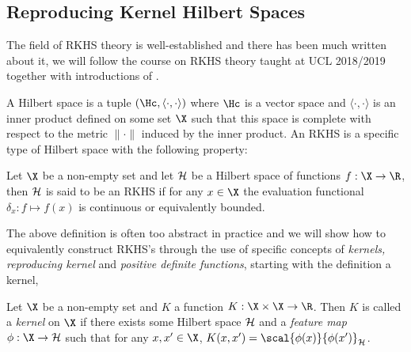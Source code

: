 \subsection{Reproducing Kernel Hilbert Spaces} The field of RKHS theory is
well-established and there has been much written about it, we will follow the
course on RKHS theory taught at UCL 2018/2019
\citep{gretton18_advan_topic_machin_learn} together with introductions of
\citep{manton15_primer_reprod_kernel_hilber_spaces,fasshauer11_posit_defin_kernel}.

A Hilbert space is a tuple \((\Hc, \langle \cdot, \cdot \rangle)\) where \(\Hc\)
is a vector space and \(\langle \cdot, \cdot \rangle\) is an inner product
defined on some set \(\X\) such that this space is complete with respect to the
metric \(\|\cdot\|\) induced by the inner product. An RKHS is a specific type of
Hilbert space with the following property:

\begin{definition}
\label{def:RKHS} Let \(\X\) be a non-empty set and let \(\mathcal{H}\) be a Hilbert
space of functions \(f: \X \to \R\), then \(\mathcal{H}\) is said to be an RKHS if
for any \(x \in \X\) the evaluation functional \(\delta_x: f \mapsto f(x)\) is
continuous or equivalently bounded.
\end{definition}

The above definition is often too abstract in practice and we will show how to
equivalently construct RKHS's through the use of specific concepts of
\emph{kernels, reproducing kernel} and \emph{positive definite functions},
starting with the definition a kernel,
\begin{definition}
\label{def:kernel} Let \(\X\) be a non-empty set and \(K\) a function \(K: \X
\times \X \to \R\). Then \(K\) is called a \textit{kernel} on \(\X\) if there
exists some Hilbert space \(\mathcal{H}\) and a \textit{feature map} \(\phi : \X
\to \rkhs{H}\) such that for any \(x, x' \in \X\), \(K(x, x') =
\scal{\phi(x)}{\phi(x')}_{\rkhs{H}}\).
\end{definition}

